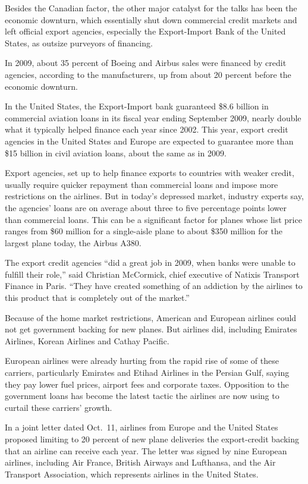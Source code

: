 ﻿\documentclass[12pt]{article}
\begin{document}
Besides the Canadian factor, the other major catalyst for the talks has been the economic downturn,
which essentially shut down commercial credit markets and left official export agencies, especially
the Export-Import Bank of the United States, as outsize purveyors of financing.

In 2009, about 35 percent of Boeing and Airbus sales were financed by credit agencies, according to
the manufacturers, up from about 20 percent before the economic downturn.

In the United States, the Export-Import bank guaranteed \$8.6 billion in commercial aviation loans
in its fiscal year ending September 2009, nearly double what it typically helped finance each year
since 2002. This year, export credit agencies in the United States and Europe are expected to
guarantee more than \$15 billion in civil aviation loans, about the same as in 2009.

Export agencies, set up to help finance exports to countries with weaker credit, usually require
quicker repayment than commercial loans and impose more restrictions on the airlines. But in today's
depressed market, industry experts say, the agencies' loans are on average about three to five
percentage points lower than commercial loans. This can be a significant factor for planes whose
list price ranges from \$60 million for a single-aisle plane to about \$350 million for the largest
plane today, the Airbus A380.

The export credit agencies ``did a great job in 2009, when banks were unable to fulfill their
role,'' said Christian McCormick, chief executive of Natixis Transport Finance in Paris. ``They have
created something of an addiction by the airlines to this product that is completely out of the
market.''

Because of the home market restrictions, American and European airlines could not get government
backing for new planes. But airlines did, including Emirates Airlines, Korean Airlines and Cathay
Pacific.

European airlines were already hurting from the rapid rise of some of these carriers, particularly
Emirates and Etihad Airlines in the Persian Gulf, saying they pay lower fuel prices, airport fees
and corporate taxes. Opposition to the government loans has become the latest tactic the airlines
are now using to curtail these carriers' growth.

In a joint letter dated Oct.~11, airlines from Europe and the United States proposed limiting to 20
percent of new plane deliveries the export-credit backing that an airline can receive each year. The
letter was signed by nine European airlines, including Air France, British Airways and Lufthansa,
and the Air Transport Association, which represents airlines in the United States.
\end{document}
